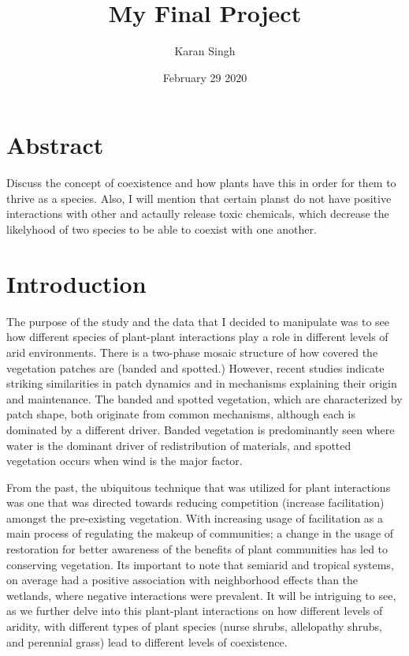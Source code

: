 \documentclass[letterpaper]{article}
\title{My Final Project}
\author{Karan Singh}
\date{February 29 2020}
\begin{document}
\maketitle
\section*{Abstract}
Discuss the concept of coexistence and how plants have this in order for them to thrive as a species. Also, I will mention that certain planst do not have positive interactions with other and actaully release toxic chemicals, which decrease the likelyhood of two species to be able to coexist with one another.
\newpage
\tableofcontents


\newpage
\section{Introduction}
The purpose of the study and the data that I decided to manipulate was to see how different species of plant-plant interactions play a role in different levels of arid environments. There is a two-phase mosaic structure of how covered the vegetation patches are (banded and spotted.) However, recent studies indicate striking similarities in patch dynamics and in mechanisms explaining their origin and maintenance. The banded and spotted vegetation, which are characterized by patch shape, both originate from common mechanisms, although each is dominated by a different driver. Banded vegetation is predominantly seen where water is the dominant driver of redistribution of materials, and spotted vegetation occurs when wind is the major factor.

From the past, the ubiquitous technique that was utilized for plant interactions was one that was directed towards reducing competition (increase facilitation) amongst the pre-existing vegetation. With increasing usage of facilitation as a main process of regulating the makeup of communities; a change in the usage of restoration for better awareness of the benefits of plant communities has led to conserving vegetation. Its important to note that semiarid and tropical systems, on average had a positive association with neighborhood effects than the wetlands, where negative interactions were prevalent. It will be intriguing to see, as we further delve into this plant-plant interactions on how different levels of aridity, with different types of plant species (nurse shrubs, allelopathy shrubs, and perennial grass) lead to different levels of coexistence.
\end{document}
